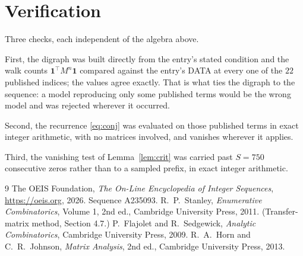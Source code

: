\documentclass[11pt,a4paper]{article}
\theoremstyle{plain}
\theoremstyle{definition}
\begin{document}
\section{Verification}

Three checks, each independent of the algebra above.

First, the digraph was built directly from the entry's stated condition and the walk counts
$\mathbf{1}^{\!\top}M^{n}\mathbf{1}$ compared against the entry's DATA at every one of
the $22$ published indices; the values agree exactly. That is what ties the digraph to
the sequence: a model reproducing only some published terms would be the wrong model and
was rejected wherever it occurred.

Second, the recurrence \eqref{eq:conj} was evaluated on those published terms in exact
integer arithmetic, with no matrices involved, and vanishes wherever it applies.

Third, the vanishing test of Lemma~\ref{lem:crit} was carried past $S=750$ consecutive
zeros rather than to a sampled prefix, in exact integer arithmetic.

\begin{thebibliography}{9}
 The OEIS Foundation, \emph{The On-Line Encyclopedia of Integer
Sequences}, \url{https://oeis.org}, 2026. Sequence A235093.
 R.~P.~Stanley, \emph{Enumerative Combinatorics}, Volume 1, 2nd ed.,
Cambridge University Press, 2011. (Transfer-matrix method, Section 4.7.)
 P.~Flajolet and R.~Sedgewick, \emph{Analytic Combinatorics}, Cambridge
University Press, 2009.
 R.~A.~Horn and C.~R.~Johnson, \emph{Matrix Analysis}, 2nd ed., Cambridge
University Press, 2013.
\end{thebibliography}
\end{document}
